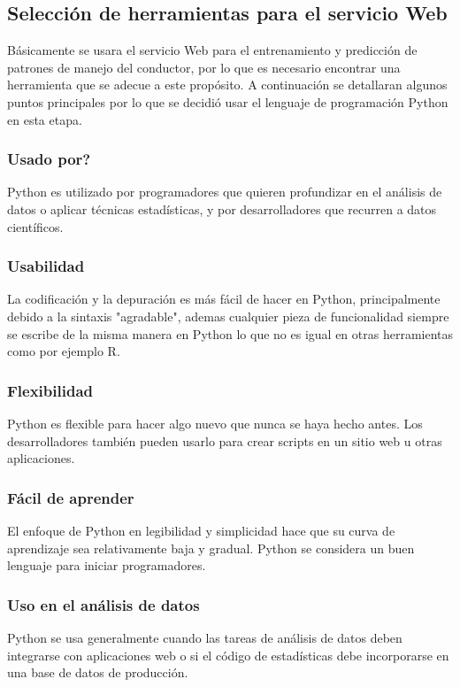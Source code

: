 \subsection{Selección de herramientas para el servicio Web}
Básicamente se usara el servicio Web para el entrenamiento y predicción de patrones de manejo del conductor, por lo que es necesario encontrar una herramienta que se adecue a este propósito.
A continuación se detallaran algunos puntos principales por lo que se decidió usar el lenguaje de programación Python en esta etapa.
\subsubsection{Usado por?}
Python es utilizado por programadores que quieren profundizar en el análisis de datos o aplicar técnicas estadísticas, y por desarrolladores que recurren a datos científicos.
\subsubsection{Usabilidad}
La codificación y la depuración es más fácil de hacer en Python, principalmente debido a la sintaxis "agradable", ademas cualquier pieza de funcionalidad siempre se escribe de la misma manera en Python lo que no es igual en otras herramientas como por ejemplo R.
\subsubsection{Flexibilidad}
Python es flexible para hacer algo nuevo que nunca se haya hecho antes. Los desarrolladores también pueden usarlo para crear scripts en un sitio web u otras aplicaciones.
\subsubsection{Fácil de aprender}
El enfoque de Python en legibilidad y simplicidad hace que su curva de aprendizaje sea relativamente baja y gradual.
Python se considera un buen lenguaje para iniciar programadores.
\subsubsection{Uso en el análisis de datos}
Python se usa generalmente cuando las tareas de análisis de datos deben integrarse con aplicaciones web o si el código de estadísticas debe incorporarse en una base de datos de producción.
